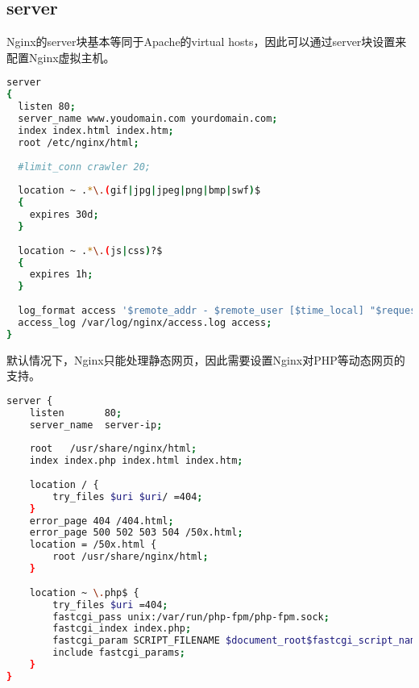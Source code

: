 \begin{lstlisting}[language=bash]

\end{lstlisting}




\begin{lstlisting}[language=bash]

\end{lstlisting}




\begin{lstlisting}[language=bash]

\end{lstlisting}


\subsection{server}




Nginx的server块基本等同于Apache的virtual hosts，因此可以通过server块设置来配置Nginx虚拟主机。



\begin{lstlisting}[language=bash]
server
{
  listen 80;
  server_name www.youdomain.com yourdomain.com;
  index index.html index.htm;
  root /etc/nginx/html;
  
  #limit_conn crawler 20;
  
  location ~ .*\.(gif|jpg|jpeg|png|bmp|swf)$
  {
    expires 30d;
  }
  
  location ~ .*\.(js|css)?$
  {
    expires 1h;
  }
  
  log_format access '$remote_addr - $remote_user [$time_local] "$request" $status $body_bytes_sent "$http_referer" "$http_user_agent" $http_x_forwarded_for';
  access_log /var/log/nginx/access.log access;  
}
\end{lstlisting}


默认情况下，Nginx只能处理静态网页，因此需要设置Nginx对PHP等动态网页的支持。



\begin{lstlisting}[language=bash]
server {
    listen       80;
    server_name  server-ip;
 
    root   /usr/share/nginx/html;
    index index.php index.html index.htm;
 
    location / {
        try_files $uri $uri/ =404;
    }
    error_page 404 /404.html;
    error_page 500 502 503 504 /50x.html;
    location = /50x.html {
        root /usr/share/nginx/html;
    }
 
    location ~ \.php$ {
        try_files $uri =404;
        fastcgi_pass unix:/var/run/php-fpm/php-fpm.sock;
        fastcgi_index index.php;
        fastcgi_param SCRIPT_FILENAME $document_root$fastcgi_script_name;
        include fastcgi_params;
    }
}
\end{lstlisting}

